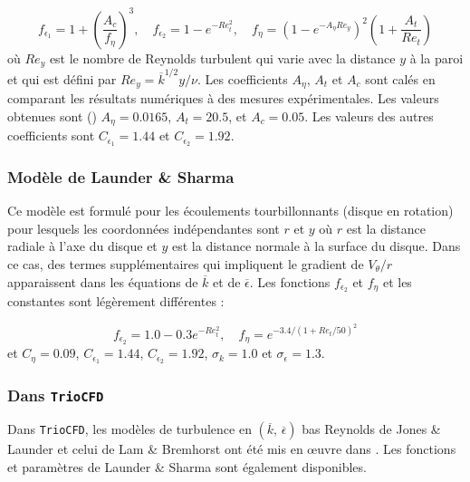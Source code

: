 \[
f_{\epsilon_{1}}=1+\left(\frac{A_{c}}{f_{\eta}}\right)^{3},\quad f_{\epsilon_{2}}=1-e^{-Re_{t}^{2}},\quad f_{\eta}=(1-e^{-A_{\eta}Re_{y}})^{2}\left(1+\frac{A_{t}}{Re_{t}}\right)
\]
o\`u $Re_{y}$ est le nombre de Reynolds turbulent qui varie avec la
distance $y$ \`a la paroi et qui est d\'efini par $Re_{y}=\overline{k}^{1/2}y/\nu$.
Les coefficients $A_{\eta}$, $A_{t}$ et $A_{c}$ sont cal\'es en comparant
les r\'esultats num\'eriques \`a des mesures exp\'erimentales. Les valeurs
obtenues sont (\cite[sec. 3.1]{Lam-Bremhorst_JFE1981}) $A_{\eta}=0.0165$,
$A_{t}=20.5$, et $A_{c}=0.05$. Les valeurs des autres coefficients
sont $C_{\epsilon_{1}}=1.44$ et $C_{\epsilon_{2}}=1.92$.


\subsubsection*{Mod\`ele de Launder \& Sharma \cite{Launder-Sharma_LettHMT1974}}

Ce mod\`ele est formul\'e pour les \'ecoulements tourbillonnants (disque
en rotation) pour lesquels les coordonn\'ees ind\'ependantes sont $r$
et $y$ o\`u $r$ est la distance radiale \`a l'axe du disque et $y$
est la distance normale \`a la surface du disque. Dans ce cas, des termes
suppl\'ementaires qui impliquent le gradient de $V_{\theta}/r$ apparaissent
dans les \'equations de $\overline{k}$ et de $\overline{\epsilon}$.
Les fonctions $f_{\epsilon_{2}}$ et $f_{\eta}$ et les constantes
sont l\'eg\`erement diff\'erentes \cite[Eqs. (5), (6)]{Launder-Sharma_LettHMT1974}
:

\[
f_{\epsilon_{2}}=1.0-0.3e^{-Re_{t}^{2}},\quad f_{\eta}=e^{-3.4/(1+Re_{t}/50)^{2}}
\]
et \cite[Eqs. (5), (6) et valeurs au-dessous]{Launder-Sharma_LettHMT1974}
$C_{\eta}=0.09$, $C_{\epsilon_{1}}=1.44$, $C_{\epsilon_{2}}=1.92$,
$\sigma_{k}=1.0$ et $\sigma_{\epsilon}=1.3$.


\subsubsection*{Dans \texttt{TrioCFD}}

Dans \texttt{TrioCFD}, les mod\`eles de turbulence en $(\overline{k},\,\overline{\epsilon})$
\og bas Reynolds \fg{} de Jones \& Launder \cite{Jones-Launder_IJHMT1972}
et celui de Lam \& Bremhorst \cite{Lam-Bremhorst_JFE1981} ont \'et\'e
mis en \oe uvre dans \cite{Peybernes_LowReynolds_NT2016}. Les fonctions
et param\`etres de Launder \& Sharma \cite{Launder-Sharma_LettHMT1974}
sont \'egalement disponibles.


